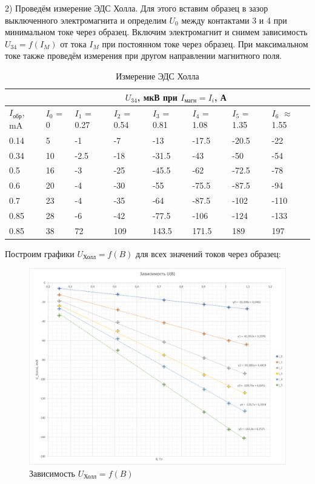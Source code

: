 \documentclass[a4paper, 14pt]{article}
\begin{document}
	2) Проведём измерение ЭДС Холла. Для этого вставим образец в зазор выключенного электромагнита и определим $U_0$ между контактами 3 и 4 при минимальном токе через образец.
	Включим электромагнит и снимем зависимость $U_{34}=f\left(I_M\right)$ от тока $I_M$ при постоянном токе через образец. При максимальном токе также проведём измерения при другом направлении магнитного поля.
		\begin{table}[h]
			\centering
			\begin{tabular}{|l||l|l|l|l|l|l|l|}
				\hline
				 & \multicolumn{7}{c|}{$U_{34}$, мкВ при $I_{\text{магн}} = I_i$, А}  \\ \hline
				$I_{\text{обр}}$, mA & $I_0$ = 0 & $I_1$ = 0.27 & $I_2$ = 0.54 & $I_3$ = 0.81 & $I_4$ = 1.08 & $I_5$ = 1.35 & $I_6$ $\approx$ 1.55 \\ \hline
				\hline
				 0.14 & 5  & -1   & -7  & -13  & -17.5  & -20.5  & -22  \\ \hline
				0.34  & 10 & -2.5  & -18  & -31.5  & -43 & -50 & -54  \\ \hline
				0.5  & 16 & -3  & -25  & -45.5  & -62 & -72.5 & -78  \\ \hline
				0.6  & 20 & -4  & -30  & -55 & -75.5 & -87.5 & -94  \\ \hline
				0.7  & 23 & -4  & -35  & -64 & -87.5 & -102 & -110  \\ \hline
				0.85  & 28 & -6  & -42 & -77.5 & -106 & -124 & -133  \\ \hline
				0.85  & 38 & 72  & 109 & 143.5 & 171.5 & 189 & 197  \\ \hline
			\end{tabular}
			\caption{Измерение ЭДС Холла}
		\end{table}
	
	
	Построим графики $U_{\text{{Холл}}} = f(B)$ для всех значений токов через образец: 
	
	\begin{figure}[h!]
		\centering
		\includegraphics[width = \textwidth]{Gr2}
		\caption{Зависимость $U_{\text{{Холл}}} = f(B)$}
	\end{figure}
	
\end{document}

